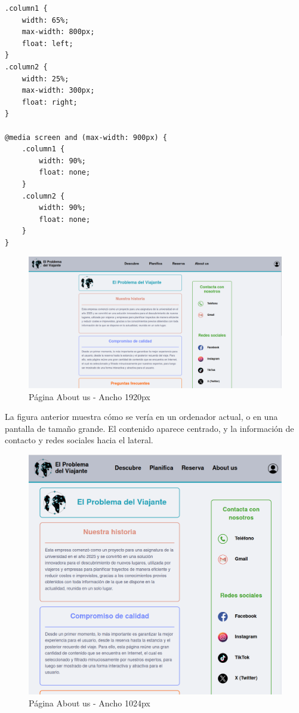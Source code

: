 \documentclass[11pt, a4paper]{book}
\begin{document}
	\begin{lstlisting}[]
.column1 {
	width: 65%;
	max-width: 800px;
	float: left;
}
.column2 {
	width: 25%;
	max-width: 300px;
	float: right;
}

@media screen and (max-width: 900px) {
	.column1 {
		width: 90%;
		float: none;
	}
	.column2 {
		width: 90%;
		float: none;
	}
}
	\end{lstlisting}

	\begin{figure} [H]
		\centering
		\includegraphics[width=\textwidth]{CSS/3-1 1920.png}
		\caption{Página About us - Ancho 1920px}
	\end{figure}

	La figura anterior muestra cómo se vería en un ordenador actual, o en una pantalla de tamaño grande. El contenido aparece centrado, y la información de contacto y redes sociales hacia el lateral.
	
	\begin{figure} [H]
		\centering
		\includegraphics[height=0.4\textheight]{CSS/3-3 1024.png}
		\caption{Página About us - Ancho 1024px}
	\end{figure}
\end{document}
